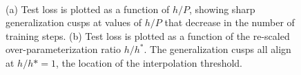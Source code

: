 \documentclass[11pt]{article}
\begin{document}
\begin{figure}[!h]
\centering
\captionsetup{width=.8\linewidth}
\\
\caption{(a) Test loss is plotted as a function of $h/P$, showing sharp generalization cusps at values of $h/P$ that decrease in the number of training steps. (b) Test loss is plotted as a function of the re-scaled over-parameterization ratio $h/h^*$. The generalization cusps all align at $h/h*=1$, the location of the interpolation threshold.}
\label{h/P_and_h_star_vs_test_loss_log}
\end{figure}
\end{document}
